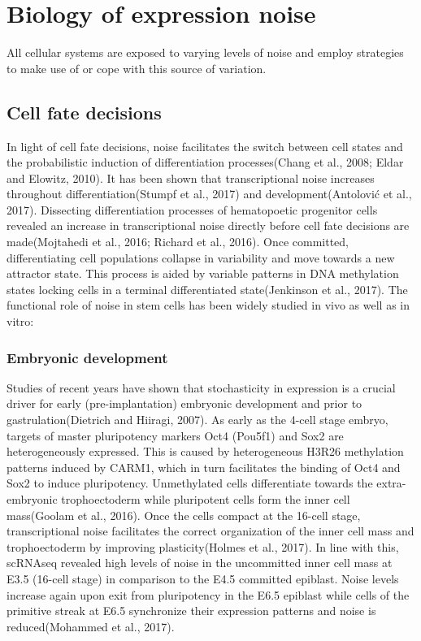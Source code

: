 
\section{Biology of expression noise} 

All cellular systems are exposed to varying levels of noise and employ strategies to make use of or cope with this source of variation. 

\subsection{Cell fate decisions}

In light of cell fate decisions, noise facilitates the switch between 
cell states and the probabilistic induction of differentiation processes(Chang et al., 2008; Eldar and Elowitz, 2010). It has been shown that transcriptional noise increases throughout differentiation(Stumpf et al., 2017) and development(Antolović et al., 2017). Dissecting differentiation processes of hematopoetic progenitor cells revealed an increase in transcriptional noise directly before cell fate decisions are made(Mojtahedi et al., 2016; Richard et al., 2016). Once committed, differentiating cell populations collapse in variability and move towards a new attractor state. This process is aided by variable patterns in DNA methylation states locking cells in a terminal differentiated state(Jenkinson et al., 2017). The functional role of noise in stem cells has been widely studied in vivo as well as in vitro:

\subsubsection*{Embryonic development}

Studies of recent years have shown that stochasticity in expression is a crucial driver for early (pre-implantation) embryonic development and prior to gastrulation(Dietrich and Hiiragi, 2007). As early as the 4-cell stage embryo, targets of master pluripotency markers Oct4 (Pou5f1) and Sox2 are heterogeneously expressed.  This is caused by heterogeneous H3R26 methylation patterns induced by CARM1, which in turn facilitates the binding of Oct4 and Sox2 to induce pluripotency. Unmethylated cells differentiate towards the extra-embryonic trophoectoderm while pluripotent cells form the inner cell mass(Goolam et al., 2016). Once the cells compact at the 16-cell stage, transcriptional noise facilitates the correct organization of the inner cell mass and trophoectoderm by improving plasticity(Holmes et al., 2017). In line with this, scRNAseq revealed high levels of noise in the uncommitted inner cell mass at E3.5 (16-cell stage) in comparison to the E4.5 committed epiblast. Noise levels increase again upon exit from pluripotency in the E6.5 epiblast while cells of the primitive streak at E6.5 synchronize their expression patterns and noise is reduced(Mohammed et al., 2017).


